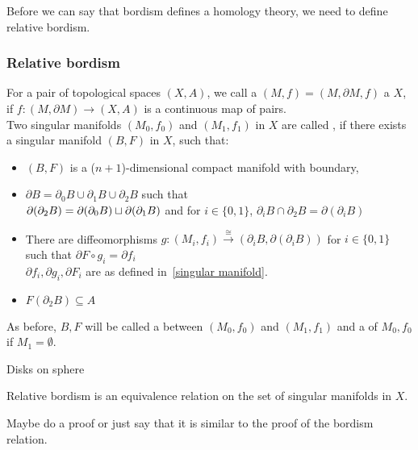 \documentclass[a4paper,11pt]{article}
\begin{document}
Before we can say that bordism defines a homology theory, we need to define relative bordism.

\subsubsection{Relative bordism}

\begin{definition}
    For a pair of topological spaces \((X,A)\), we call a \((M,f)=(M,\partial M,f)\) a \(X\), if \(f:(M,\partial M)\to (X,A)\) is a continuous map of pairs.\\
    Two singular manifolds \((M_0,f_0)\) and \((M_1,f_1)\) in \(X\) are called , if there exists a singular manifold \((B,F)\) in \(X\), such that:
    \begin{itemize}
        \item \((B,F)\) is a (\(n+1\))-dimensional compact manifold with boundary,
        \item \(\partial B=\partial_0B\cup\partial_1B\cup\partial_2B\) such that \\
                \(\partial(\partial_2B)=\partial(\partial_0B)\sqcup\partial(\partial_1B)\) and
                for \(i\in\{0,1\}\), \(\partial_i B\cap\partial_2B=\partial(\partial_i B)\)
        \item There are diffeomorphisms \(g:(M_i,f_i)\xrightarrow{\cong}(\partial_{i} B,\partial(\partial_{i}B))\) for \(i\in\{0,1\}\) such that \(\partial F\circ g_i=\partial f_i\)\\
        \(\partial f_i, \partial g_i, \partial F_i\) are as defined in\ \ref{singular manifold}.
        \item \(F(\partial_2B)\subseteq A\)
    \end{itemize}
    As before, \(B,F\) will be called a  between \((M_0,f_0)\) and \((M_1,f_1)\) and a  of \(M_0,f_0\) if \(M_1=\emptyset\).
\end{definition}

\begin{example}
    Disks on sphere
\end{example}

\begin{theorem}\cite[p.525]{dieck}
    Relative bordism is an equivalence relation on the set of singular manifolds in \(X\).
\end{theorem}

Maybe do a proof or just say that it is similar to the proof of the bordism relation.
\end{document}
